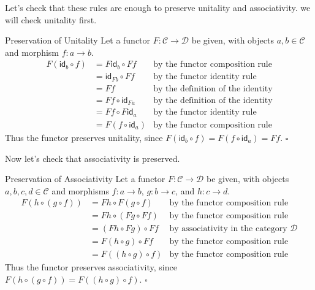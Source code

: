 \documentclass[12pt]{article}
\begin{document}
Let's check that these rules are enough to preserve unitality and associativity.
we will check unitality first.
\begin{proofbox}{Preservation of Unitality}{}
  Let a functor $F:\mathcal{C} \rightarrow \mathcal{D}$ be given, with objects $a,b\in\mathcal{C}$ and morphism $f:a \rightarrow b$.
  \begin{align*}
    F(\mathsf{id}_b \circ f) & = F\mathsf{id}_b \circ Ff   & \text{by the functor composition rule}   \\
                             & = \mathsf{id}_{Fb} \circ Ff & \text{by the functor identity rule}      \\
                             & = Ff                        & \text{by the definition of the identity} \\
                             & = Ff \circ \mathsf{id}_{Fa} & \text{by the definition of the identity} \\
                             & = Ff \circ F\mathsf{id}_a   & \text{by the functor identity rule}      \\
                             & = F(f \circ \mathsf{id}_a)  & \text{by the functor composition rule}
  \end{align*}
  Thus the functor preserves unitality, since $F(\mathsf{id}_b \circ f) = F(f \circ \mathsf{id}_a) = Ff$. $\square$
\end{proofbox}
Now let's check that associativity is preserved.
\begin{proofbox}{Preservation of Associativity}{}
  Let a functor $F:\mathcal{C} \rightarrow \mathcal{D}$ be given, with objects $a,b,c,d\in\mathcal{C}$ and morphisms $f:a \rightarrow b$, $g:b \rightarrow c$, and $h:c \rightarrow d$.
  \begin{align*}
    F(h \circ (g \circ f)) & = Fh \circ F(g \circ f)  & \text{by the functor composition rule}                \\
                           & = Fh \circ (Fg \circ Ff) & \text{by the functor composition rule}                \\
                           & = (Fh \circ Fg) \circ Ff & \text{by associativity in the category $\mathcal{D}$} \\
                           & = F(h \circ g) \circ Ff  & \text{by the functor composition rule}                \\
                           & = F((h \circ g) \circ f) & \text{by the functor composition rule}
  \end{align*}
  Thus the functor preserves associativity, since $F(h \circ (g \circ f)) = F((h \circ g) \circ f)$. $\square$
\end{proofbox}
\end{document}
